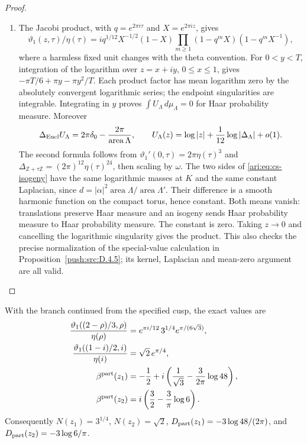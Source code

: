 \begin{proof}
\begin{enumerate}[label=\arabic*.,leftmargin=*]
\item The Jacobi product, with $q=e^{2\pi i\tau}$ and
$X=e^{2\pi iz}$, gives
\[
 \vartheta _1(z,\tau)/\eta(\tau)
 =i q^{1/12}X^{-1/2}(1-X)
     \prod_{m\ge1}(1-q^mX)(1-q^mX^{-1}),
\]
where a harmless fixed unit changes with the theta convention. For
$0<y<T$, integration of the logarithm over $z=x+iy$, $0\le x\le1$,
gives $-\pi T/6+\pi y-\pi y^2/T$. Each product factor has mean logarithm
zero by the absolutely convergent logarithmic series; the endpoint
singularities are integrable. Integrating in $y$ proves
$\int U_\Lambda\,d\mu_\Lambda=0$ for Haar probability measure.
Moreover
\[
 \Delta_{\rm Eucl}U_\Lambda
   =2\pi\delta_0-\frac{2\pi}{\operatorname{area}\Lambda},\qquad
 U_\Lambda(z)=\log|z|+\frac1{12}\log|\Delta_\Lambda|+o(1).
\]
The second formula follows from
$\vartheta _1'(0,\tau)=2\pi\eta(\tau)^3$ and
$\Delta_{\mathbb Z+\tau\mathbb Z}=(2\pi)^{12}\eta(\tau)^{24}$,
then scaling by $\omega$. The two sides of
\eqref{ari:eq:cs-isogeny} have the same logarithmic masses at $K$ and the
same constant Laplacian, since
$d=|\alpha|^2\operatorname{area}\Lambda/
\operatorname{area}\Lambda'$. Their difference is a smooth harmonic
function on the compact torus, hence constant. Both means vanish:
translations preserve Haar measure and an isogeny sends Haar
probability measure to Haar probability measure. The constant is zero.
Taking $z\to0$ and cancelling the logarithmic singularity gives the
product. This also checks the precise normalization of the special-value calculation in Proposition~\ref{push:src:D.4.5};
its kernel, Laplacian and mean-zero argument are all valid.
\end{enumerate}
\end{proof}
\begin{proposition}\hypertarget{tag-000J}{}\label{ari:C.1.2}

With the branch continued from the specified cusp, the exact values are
\begin{align*}
 \frac{\vartheta _1((2-\rho)/3,\rho)}{\eta(\rho)}
   &=e^{\pi i/12}\,3^{1/4}e^{\pi/(6\sqrt3)},\\
 \frac{\vartheta _1((1-i)/2,i)}{\eta(i)}
   &=\sqrt2\,e^{\pi/4},\\
 \beta^{\rm part}(z_1)
   &=-\frac12+i\left(\frac1{\sqrt3}-\frac3{2\pi}\log48\right),\\
 \beta^{\rm part}(z_2)
   &=i\left(\frac32-\frac3\pi\log6\right).
\end{align*}
Consequently $N(z_1)=3^{1/4}$, $N(z_2)=\sqrt2$,
$D_{\rm part}(z_1)=-3\log48/(2\pi)$, and
$D_{\rm part}(z_2)=-3\log6/\pi$.
\end{proposition}


